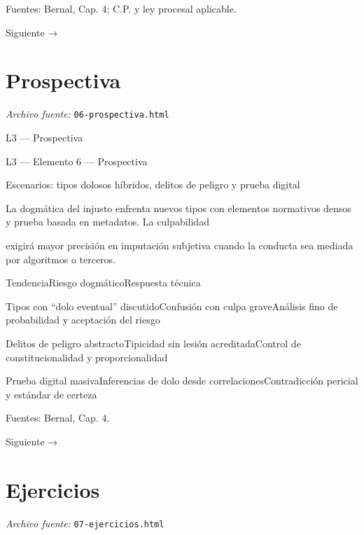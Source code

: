 \documentclass[11pt,a4paper]{article}
\begin{document}
    Fuentes: Bernal, Cap. 4; C.P. y ley procesal aplicable.\par

    Siguiente →\par

\section{Prospectiva}
\noindent\textit{Archivo fuente:} \texttt{06-prospectiva.html}

L3 — Prospectiva\par





    L3 — Elemento 6 — Prospectiva\par
    Escenarios: tipos dolosos híbridos, delitos de peligro y prueba digital\par


      La dogmática del injusto enfrenta nuevos tipos con elementos normativos densos y prueba basada en metadatos. La culpabilidad\par
      exigirá mayor precisión en imputación subjetiva cuando la conducta sea mediada por algoritmos o terceros.\par





          TendenciaRiesgo dogmáticoRespuesta técnica\par




          Tipos con “dolo eventual” discutidoConfusión con culpa graveAnálisis fino de probabilidad y aceptación del riesgo\par

          Delitos de peligro abstractoTipicidad sin lesión acreditadaControl de constitucionalidad y proporcionalidad\par

          Prueba digital masivaInferencias de dolo desde correlacionesContradicción pericial y estándar de certeza\par







    Fuentes: Bernal, Cap. 4.\par

    Siguiente →\par

\section{Ejercicios}
\noindent\textit{Archivo fuente:} \texttt{07-ejercicios.html}
\end{document}
